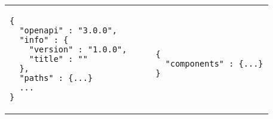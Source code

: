 \begin{tabular}{m{} m{}|m{} m{}}
\begin{lstlisting}[style=htmlcssjs, label=lst:example_suitably_formated_oas_file, caption=OpenAPI document with the required paths-object ,captionpos=b]
{
  "openapi" : "3.0.0",
  "info" : {
    "version" : "1.0.0",
    "title" : ""
  },
  "paths" : {...}
  ...
}
\end{lstlisting}

& 
&
&
\begin{lstlisting}[style=htmlcssjs, caption=Valid OpenAPI document without a path-object ,captionpos=b, label=lst:example_unsuitable_but_valid_oas_file]



{
  "components" : {...}
}



\end{lstlisting}
\\
\end{tabular}